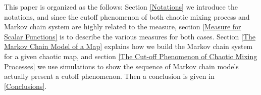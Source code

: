 \documentclass{article}
\begin{document}
This paper is organized as the follows: Section \ref{Notations} we introduce the notations, and since the cutoff phenomenon of both chaotic mixing process and Markov chain system are highly related to the measure, section \ref{Measure for Scalar Functions} is to describe the various measures for both cases. Section \ref{The Markov Chain Model of a Map} explains how we build the Markov chain system for a given chaotic map, and section \ref{The Cut-off Phenomenon of Chaotic Mixing Processes} we use simulations to show the sequence of Markov chain models actually present a cutoff phenomenon. Then a conclusion is given in \ref{Conclusions}. 
 
\end{document}
